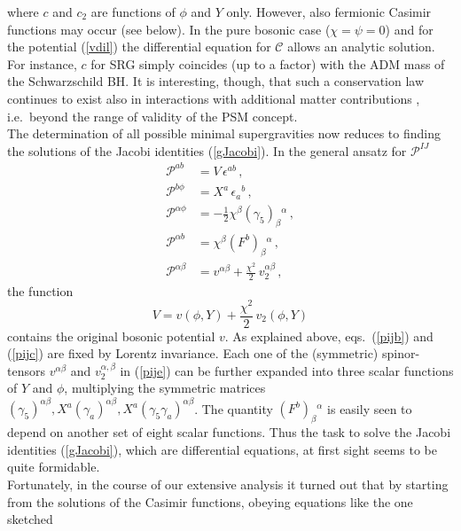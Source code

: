 \documentclass[a4paper,10pt]{article}
\newcommand{\casimir}{c}
\renewcommand{\^}{{}^}
\renewcommand{\_}{\!{}_}
\begin{document}
where $\casimir$ and $\casimir_2$ are functions of $\phi$ 
and $Y$ only. 
However, also 
fermionic Casimir functions may occur (see below). In the 
pure bosonic case ($\chi = \psi = 0$) and for the potential 
(\ref{vdil}) the differential equation for $\mathcal{C}$ allows an 
analytic solution. For instance, $c$ for SRG simply coincides 
(up to a factor) with the ADM mass of the Schwarzschild BH. 
It is interesting, though, that such a conservation law 
continues to exist also in interactions with additional 
matter contributions \cite{Kummer:1995qv}, i.e.\ beyond the range of 
validity of the PSM concept. \\
The determination of all possible minimal supergravities 
\cite{EKS,Ertl:Diss} now reduces to finding the solutions of the Jacobi 
identities (\ref{gJacobi}). In the general ansatz for 
$\mathcal{P}^{IJ}$ 
\begin{align}
\mathcal{P}^{ab} &=  V\, \epsilon^{ab}\, ,\label{pija}\\
\mathcal{P}^{b\phi} &=  X^a\, \epsilon_a{}^b\, ,\label{pijb}\\
\mathcal{P}^{\alpha\phi} &=  -\frac{1}{2} \chi^\beta 
(\gamma_5)_\beta{}^\alpha\, ,\label{pijc} \\
\mathcal{P}^{\alpha b} &=  \chi^\beta (F^b)_\beta{}^\alpha\, 
,\label{pijd} \\
\mathcal{P}^{\alpha\beta} &=  v^{\alpha\beta} + 
\frac{\chi^2}{2} \, v_2^{\alpha\beta} \, ,
\label{pije}
\end{align}
the function 
\begin{equation}
\label{yphi}
V = v (\phi,Y) + \frac{\chi^2}{2} \, v_2 (\phi,Y) 
\end{equation}
contains the original bosonic potential $v$. As explained 
above, eqs.\ (\ref{pijb}) and 
(\ref{pijc}) are fixed by Lorentz invariance. Each one of 
the (symmetric) 
spinor-tensors $v^{\alpha\beta}$ and $v_2^{\alpha,\beta}$ 
in (\ref{pije}) can be further 
expanded into three scalar functions of $Y$ and $\phi$, multiplying 
the symmetric matrices $(\gamma_5)^{\alpha\beta}, X^a(\gamma_a)^{\alpha\beta}, 
X^a (\gamma_5\gamma_a)^{\alpha\beta}$. The quantity 
$(F^b)_\beta{}^\alpha$ is easily seen to depend on another 
set of eight scalar functions. Thus the task to solve the Jacobi 
identities (\ref{gJacobi}), which are differential 
equations, at first 
sight seems to be quite formidable.\\
Fortunately, in the course of our extensive analysis 
\cite{EKS,Ertl:Diss} 
it turned out that by starting from the solutions of the 
Casimir functions, obeying equations like the one sketched 
\end{document}
